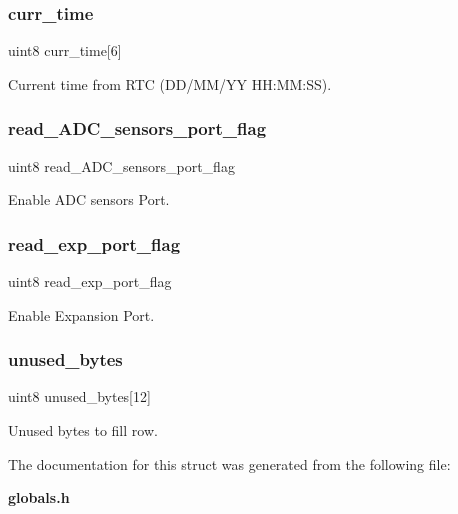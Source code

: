 \subsubsection{curr\+\_\+time}
{\footnotesize\ttfamily uint8 curr\+\_\+time[6]}

Current time from R\+TC (D\+D/\+M\+M/\+YY H\+H\+:\+MM\+:SS). \mbox{\label{structst__expansion_a35f3f96b2d425fc3934ee6cfa8166a04}} 
\subsubsection{read\+\_\+\+A\+D\+C\+\_\+sensors\+\_\+port\+\_\+flag}
{\footnotesize\ttfamily uint8 read\+\_\+\+A\+D\+C\+\_\+sensors\+\_\+port\+\_\+flag}

Enable A\+DC sensors Port. \mbox{\label{structst__expansion_aa0fa0bc36fe5fc720d757680e189f6d2}} 
\subsubsection{read\+\_\+exp\+\_\+port\+\_\+flag}
{\footnotesize\ttfamily uint8 read\+\_\+exp\+\_\+port\+\_\+flag}

Enable Expansion Port. \mbox{\label{structst__expansion_a8ba5c3bbdccc2457552b555caf55c1be}} 
\subsubsection{unused\+\_\+bytes}
{\footnotesize\ttfamily uint8 unused\+\_\+bytes[12]}

Unused bytes to fill row. 

The documentation for this struct was generated from the following file\+:\begin{DoxyCompactItemize}
\item 
\textbf{ globals.\+h}\end{DoxyCompactItemize}
